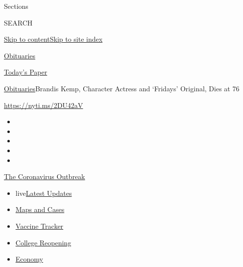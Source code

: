 Sections

SEARCH

\protect\hyperlink{site-content}{Skip to
content}\protect\hyperlink{site-index}{Skip to site index}

\href{https://www.nytimes.com/section/obituaries}{Obituaries}

\href{https://myaccount.nytimes.com/auth/login?response_type=cookie\&client_id=vi}{}

\href{https://www.nytimes.com/section/todayspaper}{Today's Paper}

\href{/section/obituaries}{Obituaries}\textbar{}Brandis Kemp, Character
Actress and `Fridays' Original, Dies at 76

\url{https://nyti.ms/2DU42aV}

\begin{itemize}
\item
\item
\item
\item
\item
\end{itemize}

\href{https://www.nytimes.com/news-event/coronavirus?action=click\&pgtype=Article\&state=default\&region=TOP_BANNER\&context=storylines_menu}{The
Coronavirus Outbreak}

\begin{itemize}
\tightlist
\item
  live\href{https://www.nytimes.com/2020/08/03/world/coronavirus-covid-19.html?action=click\&pgtype=Article\&state=default\&region=TOP_BANNER\&context=storylines_menu}{Latest
  Updates}
\item
  \href{https://www.nytimes.com/interactive/2020/us/coronavirus-us-cases.html?action=click\&pgtype=Article\&state=default\&region=TOP_BANNER\&context=storylines_menu}{Maps
  and Cases}
\item
  \href{https://www.nytimes.com/interactive/2020/science/coronavirus-vaccine-tracker.html?action=click\&pgtype=Article\&state=default\&region=TOP_BANNER\&context=storylines_menu}{Vaccine
  Tracker}
\item
  \href{https://www.nytimes.com/2020/08/02/us/covid-college-reopening.html?action=click\&pgtype=Article\&state=default\&region=TOP_BANNER\&context=storylines_menu}{College
  Reopening}
\item
  \href{https://www.nytimes.com/live/2020/08/03/business/stock-market-today-coronavirus?action=click\&pgtype=Article\&state=default\&region=TOP_BANNER\&context=storylines_menu}{Economy}
\end{itemize}

